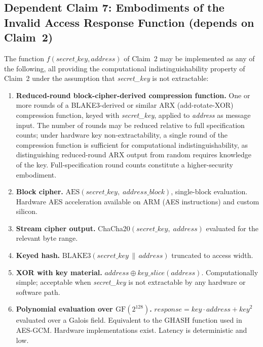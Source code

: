 \documentclass[12pt,letterpaper]{article}
\begin{document}
\medskip

\subsection*{Dependent Claim 7: Embodiments of the Invalid Access Response
  Function (depends on Claim~2)}

The function $f(\textit{secret\_key}, \textit{address})$ of Claim~2 may be
implemented as any of the following, all providing the computational
indistinguishability property of Claim~2 under the assumption that
\textit{secret\_key} is not extractable:

\begin{enumerate}[label=(\alph*),noitemsep]
  \item \textbf{Reduced-round block-cipher-derived compression function.}
        One or more rounds of a BLAKE3-derived or similar ARX
        (add-rotate-XOR) compression function, keyed with \textit{secret\_key},
        applied to \textit{address} as message input.
        The number of rounds may be reduced relative to full specification
        counts; under hardware key non-extractability, a single round of
        the compression function is sufficient for computational
        indistinguishability, as distinguishing reduced-round ARX output
        from random requires knowledge of the key.
        Full-specification round counts constitute a higher-security embodiment.

  \item \textbf{Block cipher.}
        $\text{AES}(\textit{secret\_key},\; \textit{address\_block})$,
        single-block evaluation.
        Hardware AES acceleration available on ARM (AES instructions) and
        custom silicon.

  \item \textbf{Stream cipher output.}
        ChaCha20$(\textit{secret\_key},\; \textit{address})$ evaluated for
        the relevant byte range.

  \item \textbf{Keyed hash.}
        $\text{BLAKE3}(\textit{secret\_key} \,\|\, \textit{address})$
        truncated to access width.

  \item \textbf{XOR with key material.}
        $\textit{address} \oplus \textit{key\_slice}(\textit{address})$.
        Computationally simple; acceptable when \textit{secret\_key} is
        not extractable by any hardware or software path.

  \item \textbf{Polynomial evaluation over $\mathrm{GF}(2^{128})$.}
        $\textit{response} = \textit{key} \cdot \textit{address} +
        \textit{key}^2$ evaluated over a Galois field.
        Equivalent to the GHASH function used in AES-GCM.
        Hardware implementations exist.
        Latency is deterministic and low.
\end{enumerate}
\end{document}
